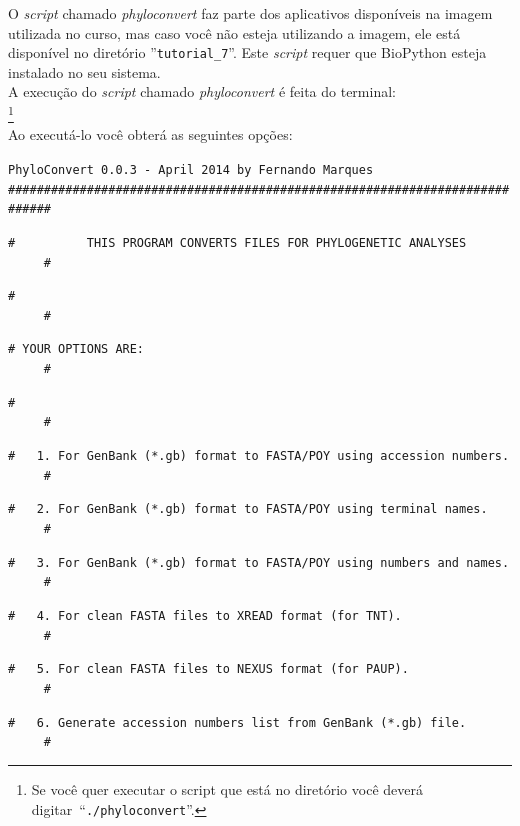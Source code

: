\begin{refsection}
O \textit{script} chamado \textit{phyloconvert} faz parte dos aplicativos disponíveis na imagem utilizada no curso, mas caso você não esteja utilizando a imagem, ele está disponível no diretório ''\texttt{tutorial\_7}''. Este \textit{script} requer que BioPython esteja instalado no seu sistema.\\

	A execução do \textit{script} chamado \textit{phyloconvert} é feita do terminal:\\

\footnote{Se você quer executar o script que está no diretório você deverá digitar~``\texttt{./phyloconvert}''.}\\

Ao executá-lo você obterá as seguintes opções:\\

\scriptsize

\noindent\texttt{PhyloConvert~0.0.3~-~April~2014~by~Fernando~Marques}\\

\noindent\texttt{\#\#\#\#\#\#\#\#\#\#\#\#\#\#\#\#\#\#\#\#\#\#\#\#\#\#\#\#\#\#\#\#\#\#\#\#\#\#\#\#\#\#\#\#\#\#\#\#\#\#\#\#\#\#\#\#\#\#\#\#\#\#\#\#\#\#\#\#\#\#\#\#\#\#\#\#}

\noindent\texttt{\#~~~~~~~~~~THIS~PROGRAM~CONVERTS~FILES~FOR~PHYLOGENETIC~ANALYSES~~~~~~~~~~~\#}

\noindent\texttt{\#~~~~~~~~~~~~~~~~~~~~~~~~~~~~~~~~~~~~~~~~~~~~~~~~~~~~~~~~~~~~~~~~~~~~~~~~~~\#}

\noindent\texttt{\#~YOUR~OPTIONS~ARE:~~~~~~~~~~~~~~~~~~~~~~~~~~~~~~~~~~~~~~~~~~~~~~~~~~~~~~~~\#}

\noindent\texttt{\#~~~~~~~~~~~~~~~~~~~~~~~~~~~~~~~~~~~~~~~~~~~~~~~~~~~~~~~~~~~~~~~~~~~~~~~~~~\#}

\noindent\texttt{\#~~~1.~For~GenBank~(*.gb)~format~to~FASTA/POY~using~accession~numbers.~~~~~\#}

\noindent\texttt{\#~~~2.~For~GenBank~(*.gb)~format~to~FASTA/POY~using~terminal~names.~~~~~~~~\#}

\noindent\texttt{\#~~~3.~For~GenBank~(*.gb)~format~to~FASTA/POY~using~numbers~and~names.~~~~~\#}

\noindent\texttt{\#~~~4.~For~clean~FASTA~files~to~XREAD~format~(for~TNT).~~~~~~~~~~~~~~~~~~~~\#}

\noindent\texttt{\#~~~5.~For~clean~FASTA~files~to~NEXUS~format~(for~PAUP).~~~~~~~~~~~~~~~~~~~\#}

\noindent\texttt{\#~~~6.~Generate~accession~numbers~list~from~GenBank~(*.gb)~file.~~~~~~~~~~~\#}


\end{refsection}
